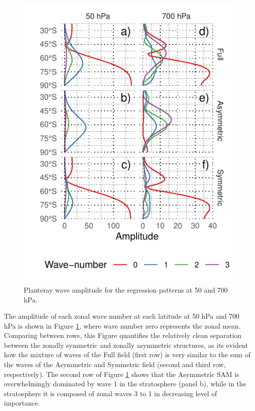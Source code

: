 \documentclass[]{ametsocV5}
\begin{document}
\begin{figure}
\includegraphics{wave-amplitude-1} \caption[Planteray wave amplitude for the regression patterns at 50 and 700 hPa]{Planteray wave amplitude for the regression patterns at 50 and 700 hPa.}\label{fig:wave-amplitude}
\end{figure}

The amplitude of each zonal wave number at each latitude at 50 hPa and
700 hPa is shown in Figure \ref{fig:wave-amplitude}, where wave number
zero represents the zonal mean. Comparing between rows, this Figure
quantifies the relatively clean separation between the zonally symmetric
and zonally asymmetric structures, as its evident how the mixture of
waves of the Full field (first row) is very similar to the sum of the
waves of the Asymmetric and Symmetric field (second and third row,
respectively). The second row of Figure \ref{fig:wave-amplitude} shows
that the Asymmetric SAM is overwhelmingly dominated by wave 1 in the
stratosphere (panel b), while in the stratosphere it is composed of
zonal waves 3 to 1 in decreasing level of importance.
\end{document}
